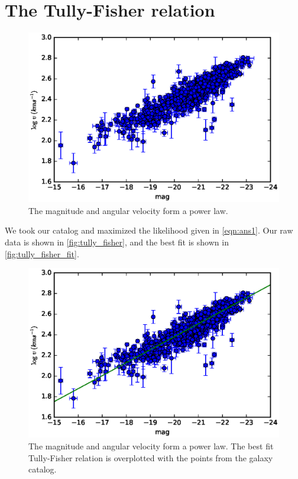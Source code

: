 \documentclass[12pt,a4paper]{article}
\begin{document}
\section{The Tully-Fisher relation}

 \begin{figure}[ht]
  \centering
  \includegraphics[keepaspectratio]{figures/tully_fisher.eps}
  \caption{The magnitude and angular velocity form a power law.}
  \label{fig:tully_fisher}
 \end{figure}


We took our catalog and maximized the likelihood given in \autoref{eqn:ans1}.
Our raw data is shown in \autoref{fig:tully_fisher}, and the best
fit is shown in \autoref{fig:tully_fisher_fit}.

 \begin{figure}[ht]
  \centering
  \includegraphics[keepaspectratio]{figures/tully_fisher_fit.eps}
  \caption{The magnitude and angular velocity form a power law.
  The best fit Tully-Fisher relation is overplotted with the
  points from the galaxy catalog.}
  \label{fig:tully_fisher_fit}
 \end{figure}
\end{document}
